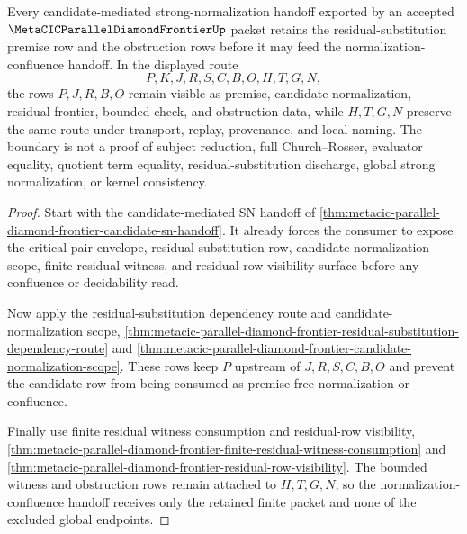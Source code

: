 \begin{theorem}
\label{thm:metacic-parallel-diamond-frontier-candidate-sn-retained-premise-boundary}
Every candidate-mediated strong-normalization handoff exported by an accepted $\MetaCICParallelDiamondFrontierUp$ packet retains the residual-substitution premise row and the obstruction rows before it may feed the normalization-confluence handoff. In the displayed route
$$
P,K,J,R,S,C,B,O,H,T,G,N ,
$$
the rows $P,J,R,B,O$ remain visible as premise, candidate-normalization, residual-frontier, bounded-check, and obstruction data, while $H,T,G,N$ preserve the same route under transport, replay, provenance, and local naming. The boundary is not a proof of subject reduction, full Church--Rosser, evaluator equality, quotient term equality, residual-substitution discharge, global strong normalization, or kernel consistency.
\end{theorem}
\begin{proof}
Start with the candidate-mediated SN handoff of \autoref{thm:metacic-parallel-diamond-frontier-candidate-sn-handoff}. It already forces the consumer to expose the critical-pair envelope, residual-substitution row, candidate-normalization scope, finite residual witness, and residual-row visibility surface before any confluence or decidability read.

Now apply the residual-substitution dependency route and candidate-normalization scope, \autoref{thm:metacic-parallel-diamond-frontier-residual-substitution-dependency-route} and \autoref{thm:metacic-parallel-diamond-frontier-candidate-normalization-scope}. These rows keep $P$ upstream of $J,R,S,C,B,O$ and prevent the candidate row from being consumed as premise-free normalization or confluence.

Finally use finite residual witness consumption and residual-row visibility, \autoref{thm:metacic-parallel-diamond-frontier-finite-residual-witness-consumption} and \autoref{thm:metacic-parallel-diamond-frontier-residual-row-visibility}. The bounded witness and obstruction rows remain attached to $H,T,G,N$, so the normalization-confluence handoff receives only the retained finite packet and none of the excluded global endpoints.
\end{proof}

